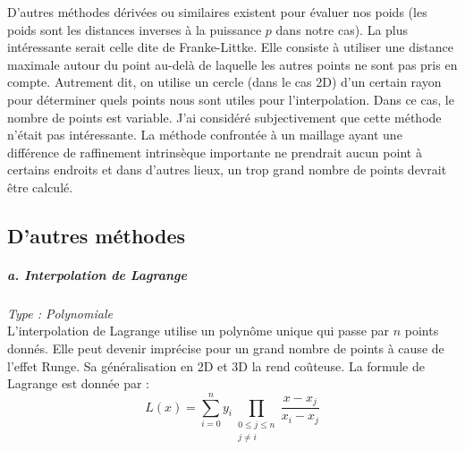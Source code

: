D'autres méthodes dérivées ou similaires existent pour évaluer nos poids (les poids sont les distances inverses à la puissance \(p\) dans notre cas). La plus intéressante serait celle dite de Franke-Littke. Elle consiste à utiliser une distance maximale autour du point au-delà de laquelle les autres points ne sont pas pris en compte. Autrement dit, on utilise un cercle (dans le cas 2D) d'un certain rayon pour déterminer quels points nous sont utiles pour l'interpolation. Dans ce cas, le nombre de points est variable.
J'ai considéré subjectivement que cette méthode n'était pas intéressante. La méthode confrontée à un maillage ayant une différence de raffinement intrinsèque importante ne prendrait aucun point à certains endroits et dans d'autres lieux, un trop grand nombre de points devrait être calculé.

\vspace{0,5 cm}


\newpage
\subsection{D'autres méthodes}\label{s223}

\subparagraph{a. Interpolation de Lagrange \cite{Barycentric_Lagrange1, Barycentric_Lagrange2}}
\textit{Type : Polynomiale} \\
\phantom{----}L'interpolation de Lagrange utilise un polynôme unique qui passe par \(n\) points donnés. Elle peut devenir imprécise pour un grand nombre de points à cause de l'effet Runge. Sa généralisation en 2D et 3D la rend coûteuse. La formule de Lagrange est donnée par :
\begin{equation}
    L(x) = \sum_{i=0}^{n} y_i \prod_{\substack{0 \leq j \leq n \\ j \neq i}} \frac{x - x_j}{x_i - x_j}
\end{equation}


